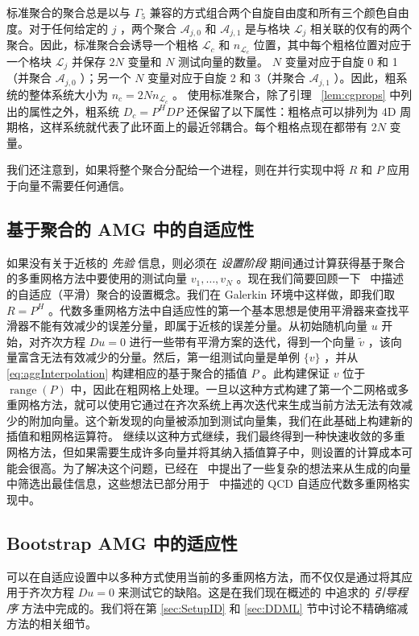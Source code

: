 \documentclass{siamltex}
\newcommand{\range}{\mathop{\mathrm{range}}\nolimits}
\begin{document}
标准聚合的聚合总是以与    $\Gamma_5$    兼容的方式组合两个自旋自由度和所有三个颜色自由度。对于任何给定的    $j$    ，两个聚合    $\mathcal{A}_{j,0}$    和    $\mathcal{A}_{j,1}$    是与格块    $\mathcal{L}_j$    相关联的仅有的两个聚合。因此，标准聚合会诱导一个粗格    $\mathcal{L}_c$    和    $n_{\mathcal{L}_c}$    位置，其中每个粗格位置对应于一个格块    $\mathcal{L}_j$    并保存    $2N$    变量和    $N$    测试向量的数量。   $N$    变量对应于自旋 0 和 1（并聚合    $\mathcal{A}_{j,0}$    ）；另一个    $N$    变量对应于自旋 2 和 3（并聚合    $\mathcal{A}_{j,1}$    ）。因此，粗系统的整体系统大小为    $n_c = 2Nn_{\mathcal{L}_c}$    。
使用标准聚合，除了引理~   \ref{lem:cgprops}    中列出的属性之外，粗系统    $D_c = P^HDP$    还保留了以下属性：粗格点可以排列为 4D 周期格，这样系统就代表了此环面上的最近邻耦合。每个粗格点现在都带有    $2N$    变量。

我们还注意到，如果将整个聚合分配给一个进程，则在并行实现中将    $R$    和    $P$    应用于向量不需要任何通信。
\subsection{基于聚合的 AMG 中的自适应性  }       \label{sec:aAggAMG}    如果没有关于近核的  {    \em    先验   }  信息，则必须在  {    \em    设置阶段   }  期间通过计算获得基于聚合的多重网格方法中要使用的测试向量    $v_1,\ldots,v_N$    。现在我们简要回顾一下~    \cite{Brezina2005}    中描述的自适应（平滑）聚合的设置概念。我们在 Galerkin 环境中这样做，即我们取    $R = P^H$    。代数多重网格方法中自适应性的第一个基本思想是使用平滑器来查找平滑器不能有效减少的误差分量，即属于近核的误差分量。从初始随机向量    $u$    开始，对齐次方程    $Du = 0$    进行一些带有平滑方案的迭代，得到一个向量    $\tilde{v}$   ，该向量富含无法有效减少的分量。然后，第一组测试向量是单例    $ \{ v \} $    ，并从    \eqref{eq:aggInterpolation}    构建相应的基于聚合的插值    $P$    。此构建保证    $v$    位于    $\range(P)$    中，因此在粗网格上处理。一旦以这种方式构建了第一个二网格或多重网格方法，就可以使用它通过在齐次系统上再次迭代来生成当前方法无法有效减少的附加向量。这个新发现的向量被添加到测试向量集，我们在此基础上构建新的插值和粗网格运算符。
继续以这种方式继续，我们最终得到一种快速收敛的多重网格方法，但如果需要生成许多向量并将其纳入插值算子中，则设置的计算成本可能会很高。为了解决这个问题，已经在~    \cite{Brezina2005}    中提出了一些复杂的想法来从生成的向量中筛选出最佳信息，这些想法已部分用于~    \cite{MGClark2010_1,MGClark2007,MGClark2010_2}    中描述的 QCD 自适应代数多重网格实现中。
\subsection{Bootstrap AMG 中的适应性  }       \label{sec:Boot}    可以在自适应设置中以多种方式使用当前的多重网格方法，而不仅仅是通过将其应用于齐次方程    $Du = 0$    来测试它的缺陷。这是在我们现在概述的    \cite{brandt2002,KahlBootstrap}    中追求的  {    \em    引导程序   }  方法中完成的。我们将在第    \ref{sec:SetupID}    和    \ref{sec:DDML}    节中讨论不精确缩减方法的相关细节。
\end{document}
